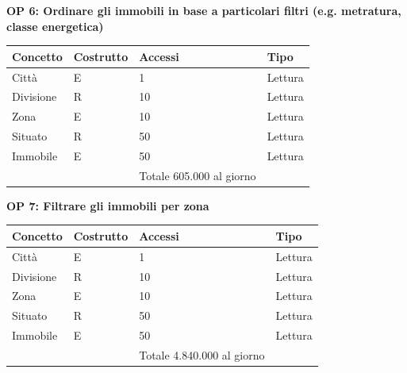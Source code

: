\documentclass[a4paper,12pt]{report}
\begin{document}
            \textbf{OP 6: Ordinare gli immobili in base a particolari filtri (e.g. metratura, classe energetica)}
        	\begin{table}[h!]
            \centering
             \begin{tabular}{||l l l l||}
             \hline
             Concetto & Costrutto & Accessi & Tipo \\ [0.5ex] 
             \hline\hline
             Città & E & 1 & Lettura \\ 
             Divisione & R & 10 & Lettura \\ 
             Zona & E & 10 & Lettura \\ 
             Situato & R & 50 & Lettura \\ 
             Immobile & E & 50 & Lettura \\
             \hline
                &   & Totale  605.000 al giorno &  \\ [1ex] 
             \hline
             \end{tabular}
            \end{table}

            \textbf{OP 7: Filtrare gli immobili per zona}
        	\begin{table}[h!]
            \centering
             \begin{tabular}{||l l l l||}
             \hline
             Concetto & Costrutto & Accessi & Tipo \\ [0.5ex] 
             \hline\hline
             Città & E & 1 & Lettura \\ 
             Divisione & R & 10 & Lettura \\ 
             Zona & E & 10 & Lettura \\ 
             Situato & R & 50 & Lettura \\ 
             Immobile & E & 50 & Lettura \\
             \hline
                &   & Totale  4.840.000 al giorno &  \\ [1ex] 
             \hline
             \end{tabular}
            \end{table}
\end{document}
